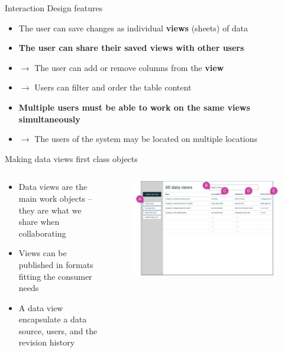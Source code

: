 \documentclass[aspectratio=169]{beamer}
\begin{document}
\begin{frame}{Interaction Design features}
    \begin{itemize}
        \item The user can save changes as individual \textbf{views} (sheets) of data
        \item \textbf{The user can share their saved views with other users}
        \item[] $\rightarrow$ The user can add or remove columns from the \textbf{view}
        \item[] $\rightarrow$ Users can filter and order the table content
        \item \textbf{Multiple users must be able to work on the same views simultaneously}
        \item[] $\rightarrow$ The users of the system may be located on multiple locations
    \end{itemize} 
\end{frame}


\begin{frame}{Making data views first class objects}
    \begin{columns}
        \begin{column}{0.4\textwidth}
            \begin{itemize}
                \footnotesize
                \item Data views are the main work objects -- they are what we share when collaborating
                \item Views can be published in formats fitting the consumer needs
                \item A data view encapsulate a data source, users, and the revision history
            \end{itemize}
        \end{column}
        \begin{column}{0.6\textwidth}
            \begin{figure}[h]
                \centering
                \includegraphics[width=1.1\textwidth]{images/all-views-with-marks.png}
            \end{figure}
        \end{column}
    \end{columns}
\end{frame}
\end{document}
